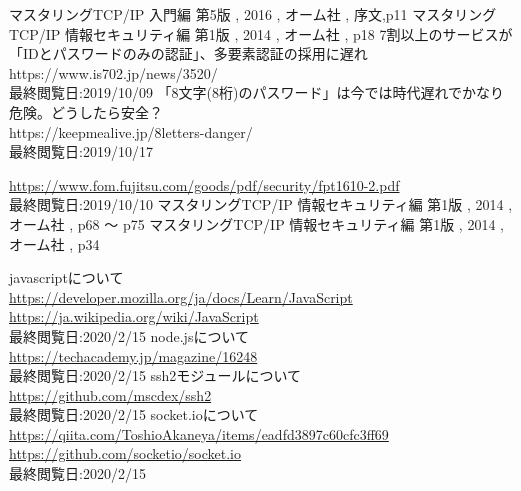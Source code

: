 \def\line{−\hspace*{-.7zw}−}

\begin{thebibliography}{99}


 マスタリングTCP/IP 入門編 第5版 , 2016 , オーム社 , 序文,p11
 マスタリングTCP/IP 情報セキュリティ編 第1版 , 2014 , オーム社 , p18
 7割以上のサービスが「IDとパスワードのみの認証」、多要素認証の採用に遅れ\\ https://www.is702.jp/news/3520/ \\最終閲覧日:2019/10/09
 「8文字(8桁)のパスワード」は今では時代遅れでかなり危険。どうしたら安全？ \\ https://keepmealive.jp/8letters-danger/ \\最終閲覧日:2019/10/17

 \url{https://www.fom.fujitsu.com/goods/pdf/security/fpt1610-2.pdf} \\最終閲覧日:2019/10/10
 マスタリングTCP/IP 情報セキュリティ編 第1版 , 2014 , オーム社 , p68 〜 p75 
 マスタリングTCP/IP 情報セキュリティ編 第1版 , 2014 , オーム社 , p34 

 javascriptについて \\ \url{https://developer.mozilla.org/ja/docs/Learn/JavaScript} \\ \url{https://ja.wikipedia.org/wiki/JavaScript}\\ 最終閲覧日:2020/2/15
 node.jsについて \\ \url{https://techacademy.jp/magazine/16248} \\ 最終閲覧日:2020/2/15
 ssh2モジュールについて \\ \url{https://github.com/mscdex/ssh2} \\ 最終閲覧日:2020/2/15
 socket.ioについて \\ \url{https://qiita.com/ToshioAkaneya/items/eadfd3897c60cfc3ff69} \\ \url{https://github.com/socketio/socket.io} \\ 最終閲覧日:2020/2/15



\end{thebibliography}
